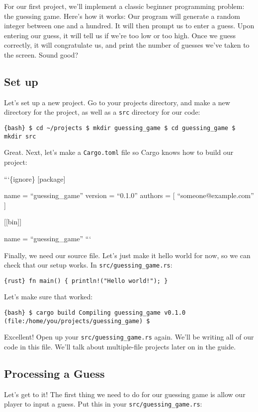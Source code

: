 \documentclass[]{article}
\begin{document}
For our first project, we'll implement a classic beginner programming
problem: the guessing game. Here's how it works: Our program will
generate a random integer between one and a hundred. It will then prompt
us to enter a guess. Upon entering our guess, it will tell us if we're
too low or too high. Once we guess correctly, it will congratulate us,
and print the number of guesses we've taken to the screen. Sound good?

\subsection{Set up}\label{set-up}

Let's set up a new project. Go to your projects directory, and make a
new directory for the project, as well as a \texttt{src} directory for
our code:

\texttt{\{bash\} \$ cd \textasciitilde{}/projects \$ mkdir guessing\_game \$ cd guessing\_game \$ mkdir src}

Great. Next, let's make a \texttt{Cargo.toml} file so Cargo knows how to
build our project:

```\{ignore\} {[}package{]}

name = ``guessing\_game'' version = ``0.1.0'' authors = {[}
``someone@example.com'' {]}

{[}{[}bin{]}{]}

name = ``guessing\_game'' ```

Finally, we need our source file. Let's just make it hello world for
now, so we can check that our setup works. In
\texttt{src/guessing\_game.rs}:

\texttt{\{rust\} fn main() \{     println!("Hello world!"); \}}

Let's make sure that worked:

\texttt{\{bash\} \$ cargo build    Compiling guessing\_game v0.1.0 (file:/home/you/projects/guessing\_game) \$}

Excellent! Open up your \texttt{src/guessing\_game.rs} again. We'll be
writing all of our code in this file. We'll talk about multiple-file
projects later on in the guide.

\subsection{Processing a Guess}\label{processing-a-guess}

Let's get to it! The first thing we need to do for our guessing game is
allow our player to input a guess. Put this in your
\texttt{src/guessing\_game.rs}:
\end{document}
